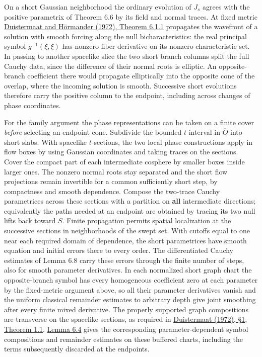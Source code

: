 \documentclass[
  english,
  11pt,
  reqno]{amsart}
\begin{document}
On a short Gaussian neighborhood the ordinary evolution of \(J_s\)
agrees with the positive parametrix of Theorem 6.6 by its field and
normal traces. At fixed metric
\hyperref[ref-DuistermaatHormander1972]{Duistermaat and Hörmander
(1972), Theorem 6.1.1} propagates the wavefront of a solution with
smooth forcing along the null bicharacteristics: the real principal
symbol \(g^{-1}(\xi,\xi)\) has nonzero fiber derivative on its nonzero
characteristic set. In passing to another spacelike slice the two short
branch columns split the full Cauchy data, since the difference of their
normal roots is elliptic. An opposite-branch coefficient there would
propagate elliptically into the opposite cone of the overlap, where the
incoming solution is smooth. Successive short evolutions therefore carry
the positive column to the endpoint, including across changes of phase
coordinates.

For the family argument the phase representations can be taken on a
finite cover \emph{before} selecting an endpoint cone. Subdivide the
bounded \(t\) interval in \(\overline O\) into short slabs. With
spacelike \(t\)-sections, the two local phase constructions apply in
flow boxes by using Gaussian coordinates and taking traces on the
sections. Cover the compact part of each intermediate cosphere by
smaller boxes inside larger ones. The nonzero normal roots stay
separated and the short flow projections remain invertible for a common
sufficiently short step, by compactness and smooth dependence. Compose
the two-trace Cauchy parametrices across these sections with a partition
on \textbf{all} intermediate directions; equivalently the paths needed
at an endpoint are obtained by tracing its two null lifts back toward
\(S\). Finite propagation permits spatial localization at the successive
sections in neighborhoods of the swept set. With cutoffs equal to one
near each required domain of dependence, the short parametrices have
smooth equation and initial errors there to every order. The
differentiated Cauchy estimates of Lemma 6.8 carry these errors through
the finite number of steps, also for smooth parameter derivatives. In
each normalized short graph chart the opposite-branch symbol has every
homogeneous coefficient zero at each parameter by the fixed-metric
argument above, so all their parameter derivatives vanish and the
uniform classical remainder estimates to arbitrary depth give joint
smoothing after every finite mixed derivative. The properly supported
graph compositions are transverse on the spacelike sections, as required
in \hyperref[ref-Duistermaat1972FIO]{Duistermaat (1972),\vadjust{\nobreak} §1, Theorem
1.1}. \hyperref[lem:online-finite-symbol-family-calculus]{Lemma 6.4}
gives the corresponding parameter-dependent symbol compositions and
remainder estimates on these buffered charts, including the terms
subsequently discarded at the endpoints.
\end{document}
